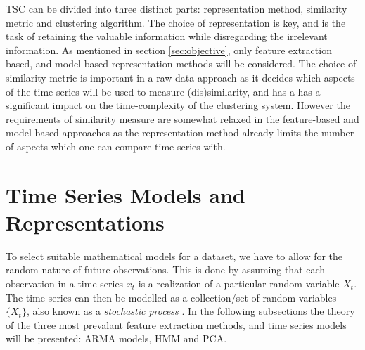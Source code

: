 TSC can be divided into three distinct parts: representation method, similarity metric and clustering algorithm. 
The choice of representation is key, and is the task of retaining the valuable information while disregarding the irrelevant information. As mentioned in section \ref{sec:objective}, only feature extraction based, and model based representation methods will be considered. 
The choice of similarity metric is important in a raw-data approach as it decides which aspects of the time series will be used to measure (dis)similarity, and has a has a significant impact on the time-complexity of the clustering system. 
However the requirements of similarity measure are somewhat relaxed in the feature-based and model-based approaches as the representation method already limits the number of aspects which one can compare time series with. 


\section{Time Series Models and Representations} \label{sec:ts_models}
To select suitable mathematical models for a dataset, we have to allow for the random nature of future observations. 
This is done by assuming that each observation in a time series $x_t$ is a realization of a particular random variable $X_t$. 
The time series can then be modelled as a collection/set of random variables $\{X_t\}$, also known as a \textit{stochastic process} \cite{brockwell_davis_advanced}. 
In the following subsections the theory of the three most prevalant feature extraction methods, and time series models will be presented: ARMA models, HMM and PCA.

